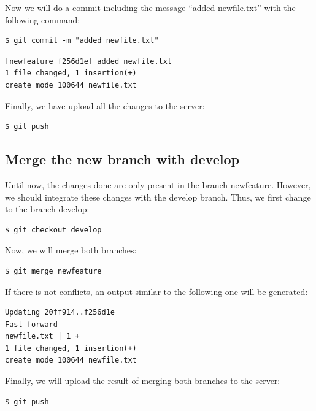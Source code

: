 \documentclass[10pt,a4paper]{article}
\begin{document}
\noindent Now we will do a commit including the message ``added newfile.txt'' with
the following command:\\

\begin{verbatim}
$ git commit -m "added newfile.txt"
\end{verbatim}


\begin{verbatim}
[newfeature f256d1e] added newfile.txt
1 file changed, 1 insertion(+)
create mode 100644 newfile.txt
\end{verbatim}


\noindent Finally, we have upload all the changes to the server:\\

\begin{verbatim}
$ git push
\end{verbatim}



\subsection{Merge the new branch with develop }\label{merge-the-new-branch-with-develop}

Until now, the changes done are only present in the branch newfeature.
However, we should integrate these changes with the develop branch.
Thus, we first change to the branch develop:\\

\begin{verbatim}
$ git checkout develop
\end{verbatim}


\noindent Now, we will merge both branches:\\

\begin{verbatim}
$ git merge newfeature
\end{verbatim}


\noindent If there is not conflicts, an output similar to the following one will
be generated:\\

\begin{verbatim}
Updating 20ff914..f256d1e
Fast-forward
newfile.txt | 1 +
1 file changed, 1 insertion(+)
create mode 100644 newfile.txt
\end{verbatim}

\noindent Finally, we will upload the result of merging both branches to the
server:\\
\begin{verbatim}
$ git push
\end{verbatim}
\end{document}
